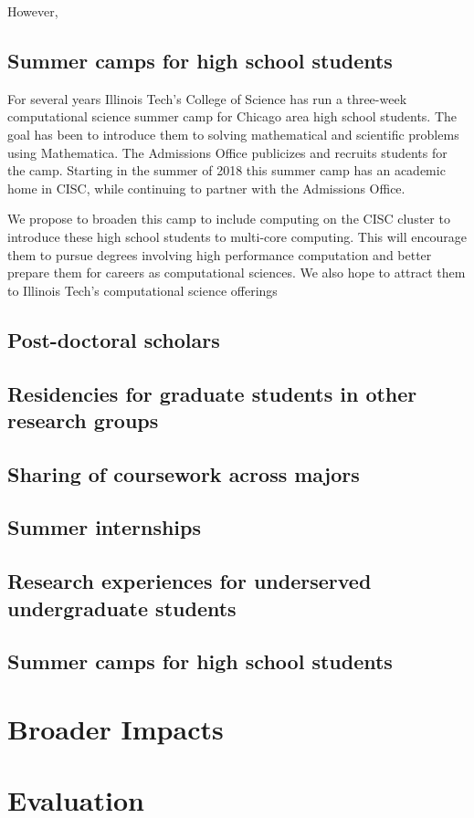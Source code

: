 \documentclass[11pt]{NSFamsart}
\begin{document}
However, 


\subsection{Summer camps for high school students} For several years Illinois Tech's College of Science has run a three-week computational science summer camp for Chicago area high school students.  The goal has been to introduce them to solving mathematical and scientific problems using Mathematica.  The Admissions Office publicizes and recruits students for the camp.  Starting in the summer of 2018 this summer camp has an academic home in CISC, while continuing to partner with the Admissions Office.

We propose to broaden this camp to include computing on the CISC cluster to introduce these high school students to multi-core computing.  This will encourage them to pursue degrees involving high performance computation and better prepare them for careers as computational sciences.  We also hope to attract them to Illinois Tech's computational science offerings


\subsection{Post-doctoral scholars} 
\subsection{Residencies for graduate students in other research groups}
\subsection{Sharing of coursework across majors}
\subsection{Summer internships} 
\subsection{Research experiences for underserved undergraduate students}
\subsection{Summer camps for high school students}




\section{Broader Impacts}
\section{Evaluation}


\newpage
\clearpage
\setcounter{page}{1}



{\renewcommand\addcontentsline[3]{} 
\renewcommand{\refname}{{\Large\textbf{References Cited}}}                   %
\renewcommand{\bibliofont}{\normalsize}

}
\end{document}
